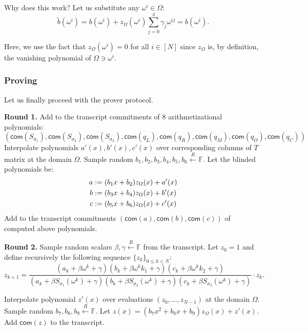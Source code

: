 \documentclass[../lecture-notes.tex]{subfiles}
\begin{document}
Why does this work? Let us substitute any $\omega^i \in \Omega$:
\begin{equation*}
    \widetilde{b}(\omega^i) = b(\omega^i) + z_{\Omega}(\omega^i)\sum_{j=0}^{\delta}\gamma_j\omega^{ij} = b(\omega^i).
\end{equation*}

Here, we use the fact that $z_{\Omega}(\omega^i) = 0$ for all $i \in [N]$ since $z_{\Omega}$ is, 
by definition, the vanishing polynomial of $\Omega \ni \omega^i$.

\subsubsection{Proving}
Let us finally proceed with the prover protocol.

\textcolor{green!60!black}{\textbf{Round 1.}} Add to the transcript commitments
of 8 arithmetizational polynomials:
\begin{equation*}
    (\mathsf{com}(S_{\sigma_1}), \mathsf{com}(S_{\sigma_2}), \mathsf{com}(S_{\sigma_3}), \mathsf{com}(q_L), \mathsf{com}(q_R), \mathsf{com}(q_M), \mathsf{com}(q_O), \mathsf{com}(q_C))
\end{equation*}
Interpolate polynomials $a'(x), b'(x), c'(x)$ over corresponding columns of $T$ matrix at
the domain $\Omega$. Sample random $b_1, b_2, b_3, b_4, b_5, b_6 \xleftarrow{R}
\mathbb{F}$. Let the blinded polynomials be:
\begin{align*}
\centering
a &:= (b_1 x + b_2)z_{\Omega}(x) + a'(x) \\
b &:= (b_3 x + b_4)z_{\Omega}(x) + b'(x) \\
c &:= (b_5 x + b_6)z_{\Omega}(x) + c'(x)
\end{align*}
Add to the transcript commitments $(\mathsf{com}(a), \mathsf{com}(b),
\mathsf{com}(c))$ of computed above polynomials.

\textcolor{green!60!black}{\textbf{Round 2.}}  Sample random scalars $\beta,
\gamma \xleftarrow{R} \mathbb{F}$ from the transcript. Let $z_0 = 1$ and define
recursively the following sequence $\{z_k\}_{0 \leq k < N}$:
\begin{equation*}
    z_{k+1} = \frac{(a_k + \beta \omega^{k} + \gamma) (b_k + \beta \omega^{k}k_1 + \gamma) (c_k + \beta \omega^{k}k_2 + \gamma)}{(a_k + \beta S_{\sigma_1}(\omega^{k}) + \gamma) (b_k + \beta S_{\sigma_2}(\omega^{k}) + \gamma) (c_k + \beta S_{\sigma_3}(\omega^{k}) + \gamma)} \cdot z_k.
\end{equation*}

Interpolate polynomial $z'(x)$ over evaluations $(z_0, \dots, z_{N-1})$ at the
domain $\Omega$. Sample random $b_7, b_8, b_9 \xleftarrow{R} \mathbb{F}$. Let $z(x)
= (b_7 x^2 + b_8 x + b_9)z_{\Omega}(x) + z'(x)$. Add $\mathsf{com}(z)$ to the transcript.
\end{document}
